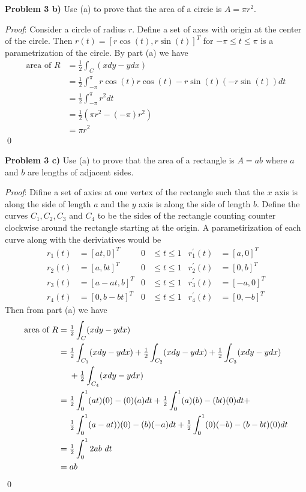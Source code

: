 \documentclass[12pt]{article}
\newcommand{\problem}[1]{\hspace{-4 ex} \large \textbf{Problem #1} }
\renewenvironment{proof}{\hspace{-4 ex} \emph{Proof}:}{\qed}
\begin{document}
\problem{3 b)} Use (a) to prove that the area of a circie is $A=\pi r^2$.

	\begin{proof}
		Consider a circle of radius $r$. Define a set of axes with origin at the center of the circle. Then $r(t) = [r\cos(t), r\sin(t)]^T$ for $-\pi \leq t \leq \pi$ is a parametrization of the circle. By part (a) we have
		\begin{align*}
			\text{area of }R & = \tfrac{1}{2}\int_C(xdy-ydx) \\
			& = \tfrac{1}{2}\int_{-\pi}^{\pi} r\cos(t)r\cos(t)-r\sin(t)(-r\sin(t))dt \\
			& = \tfrac{1}{2} \int_{-\pi}^{\pi} r^2dt \\
			& = \tfrac{1}{2} (\pi r^2 - (-\pi)r^2) \\
			& = \pi r^2
		\end{align*}
	\end{proof}
	
\problem{3 c)} Use (a) to prove that the area of a rectangle is $A=ab$ where $a$ and $b$ are lengths of adjacent sides.

	\begin{proof}
		Difine a set of axies at one vertex of the rectangle such that the $x$ axis is along the side of length $a$ and the $y$ axis is along the side of length $b$. Define the curves $C_1, C_2, C_3$ and $C_4$ to be the sides of the rectangle counting counter clockwise around the rectangle starting at the origin. A parametirization of each curve along with the deriviatives would be
		\begin{align*}
			r_1(t) & = [at,0]^T & 0 & \leq t \leq 1 & r_1^\prime(t) & = [a,0]^T\\
			r_2(t) & = [a,bt]^T & 0 & \leq t \leq 1 & r_2^\prime(t) & = [0,b]^T\\
			r_3(t) & = [a-at,b]^T & 0 & \leq t \leq 1 & r_3^\prime(t) & = [-a,0]^T\\
			r_4(t) & = [0,b-bt]^T & 0 & \leq t \leq 1 & r_4^\prime(t) & = [0,-b]^T
		\end{align*}
		Then from part (a) we have
		\begin{align*}
			\text{area of }R & = \tfrac{1}{2}\int_C(xdy-ydx) \\
			& = \tfrac{1}{2}\int_{C_1}(xdy-ydx) +\tfrac{1}{2}\int_{C_2}(xdy-ydx) +\tfrac{1}{2}\int_{C_3}(xdy-ydx) \\ 
			& \text{\space\space\space\space} +\tfrac{1}{2}\int_{C_4}(xdy-ydx) \\
			& = \tfrac{1}{2}\int_{0}^1(at)(0)-(0)(a) dt + \tfrac{1}{2}\int_{0}^1(a)(b)-(bt)(0) dt + \\
			& \text{\space\space\space\space} \tfrac{1}{2}\int_{0}^1(a-at))(0)-(b)(-a) dt + \tfrac{1}{2}\int_{0}^1(0)(-b)-(b-bt)(0) dt \\
			& = \tfrac{1}{2}\int_{0}^1 2ab \text{ } dt \\
			& = ab
		\end{align*}
	\end{proof}
\end{document}
